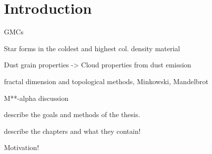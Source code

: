\chapter{Introduction}

GMCs

Star forms in the coldest and highest col. density material

Dust grain properties -> Cloud properties from dust emission

fractal dimension and topological methods, Minkowski, Mandelbrot

M**-alpha discussion

describe the goals and methods of the thesis.

describe the chapters and what they contain!

Motivation!